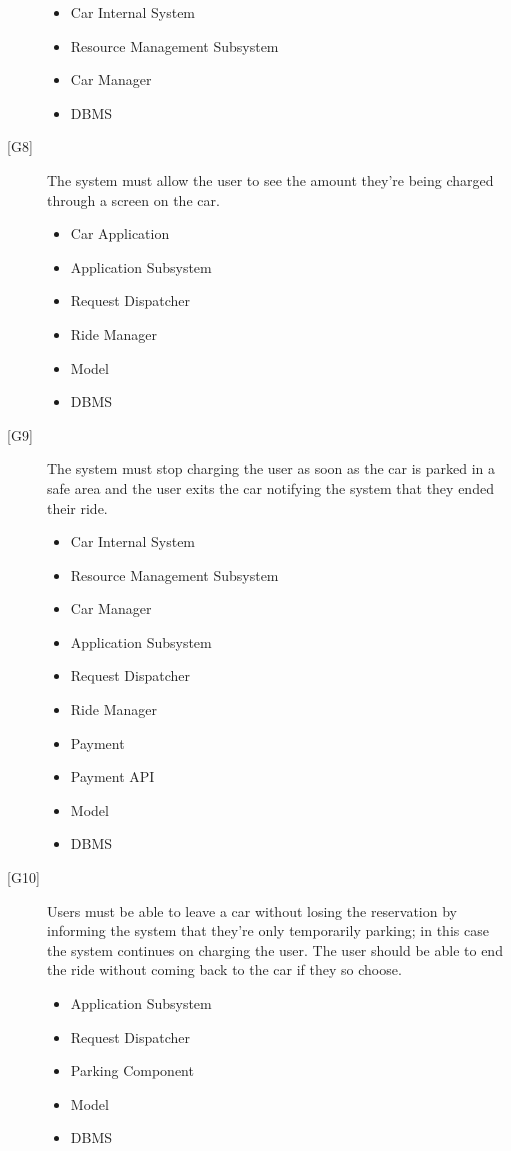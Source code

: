 \documentclass[english]{article}
\begin{document}
\begin{description}
\begin{itemize}
		\item{Car Internal System}
		\item{Resource Management Subsystem}
		\item{Car Manager}
		\item{DBMS}
	\end{itemize}
	\item[{[G8]}]{The system must allow the user to see the amount they’re being charged through a screen on the car.}
	\begin{itemize}
		\item{Car Application}
		\item{Application Subsystem}
		\item{Request Dispatcher}
		\item{Ride Manager}
		\item{Model}
		\item{DBMS}
	\end{itemize}
	\item[{[G9]}]{The system must stop charging the user as soon as the car is parked in a safe area and the user exits the car notifying the system that they ended their ride.}
	\begin{itemize}
		\item{Car Internal System}
		\item{Resource Management Subsystem}
		\item{Car Manager}
		\item{Application Subsystem}
		\item{Request Dispatcher}
		\item{Ride Manager}
		\item{Payment}
		\item{Payment API}
		\item{Model}
		\item{DBMS}
	\end{itemize}
	\item[{[G10]}]{Users must be able to leave a car without losing the reservation by informing the system that they’re only temporarily parking; in this case the system continues on charging the user. The user should be able to end the ride without coming back to the car if they so choose.}
	\begin{itemize}
		\item{Application Subsystem}
		\item{Request Dispatcher}
		\item{Parking Component}
		\item{Model}
		\item{DBMS}

\end{itemize}
\end{description}
\end{document}
